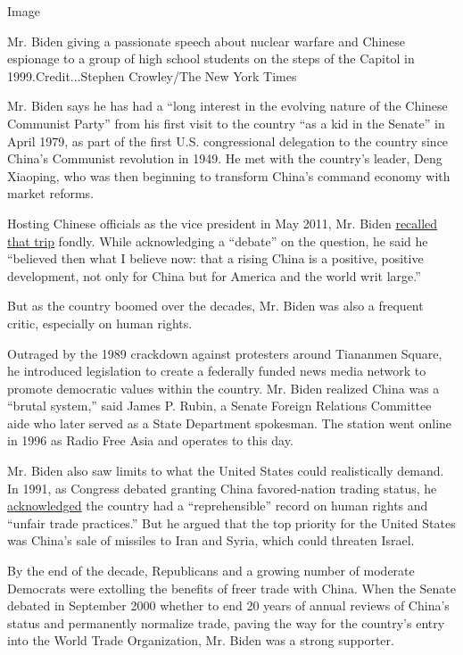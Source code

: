 Image

Mr. Biden giving a passionate speech about nuclear warfare and Chinese
espionage to a group of high school students on the steps of the Capitol
in 1999.Credit...Stephen Crowley/The New York Times

Mr. Biden says he has had a ``long interest in the evolving nature of
the Chinese Communist Party'' from his first visit to the country ``as a
kid in the Senate'' in April 1979, as part of the first U.S.
congressional delegation to the country since China's Communist
revolution in 1949. He met with the country's leader, Deng Xiaoping, who
was then beginning to transform China's command economy with market
reforms.

Hosting Chinese officials as the vice president in May 2011, Mr. Biden
\href{https://obamawhitehouse.archives.gov/the-press-office/2011/05/09/remarks-vice-president-joe-biden-opening-session-us-china-strategic-econ}{recalled
that trip} fondly. While acknowledging a ``debate'' on the question, he
said he ``believed then what I believe now: that a rising China is a
positive, positive development, not only for China but for America and
the world writ large.''

But as the country boomed over the decades, Mr. Biden was also a
frequent critic, especially on human rights.

Outraged by the 1989 crackdown against protesters around Tiananmen
Square, he introduced legislation to create a federally funded news
media network to promote democratic values within the country. Mr. Biden
realized China was a ``brutal system,'' said James P. Rubin, a Senate
Foreign Relations Committee aide who later served as a State Department
spokesman. The station went online in 1996 as Radio Free Asia and
operates to this day.

Mr. Biden also saw limits to what the United States could realistically
demand. In 1991, as Congress debated granting China favored-nation
trading status, he
\href{https://www.nytimes3xbfgragh.onion/1991/11/15/opinion/IHT-its-time-to-rope-inchinas-rogueelephant-act.html}{acknowledged}
the country had a ``reprehensible'' record on human rights and ``unfair
trade practices.'' But he argued that the top priority for the United
States was China's sale of missiles to Iran and Syria, which could
threaten Israel.

By the end of the decade, Republicans and a growing number of moderate
Democrats were extolling the benefits of freer trade with China. When
the Senate debated in September 2000 whether to end 20 years of annual
reviews of China's status and permanently normalize trade, paving the
way for the country's entry into the World Trade Organization, Mr. Biden
was a strong supporter.

